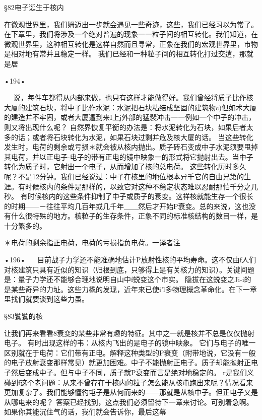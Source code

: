 {{§82电子诞生于核内

在微观世界里，我们姆迈出一步就会遇见一些奇迹，这些，我们已经习以为常了。在下章里，我们将涉及一个绝对普遍的现象一一粒子间的相互转化。我们知道，在微观世界里，这种相互转化是这样自然而且寻常，正象在我们的宏观世界里，市物是相对地有常并且稳定一样。
我们已经和一种粒子间的相互转化打过交逍，那就是居

•194•
  



  
说，每件车都得从内部来做，也只有这样才能做得好。我们曾经将质子比作核大厦的建筑石块，将中子比作水泥：水泥把石块粘结成坚固的建筑物c)但如术大厦的建造并不牢固，或者大厦遭到来I上j外部的猛裴冲击一一例如一个中子的冲击，则又将出现什么呢？
自然界恢复平衡的办法是：将水泥转化为石块，如果后者太多的话；或者将石块转化为水泥，如果石块过剩并危及核大厦的话。
当这些转化发生时，电荷的剩余或亏损＊就会被从核内抛出。质子砖石变成中子水泥须要甩掉其电荷，并以正电子-电子的带有正电的镜中映象一的形式将它抛射出去。当中子转化为质子时，它射出一个电子，从而增加了核的总电荷。
这些转化历时多久呢？不是12分钟。我们已经说过：中子在核里的地位根本异千它的自由兄第的生涯。有时候核内的条件是那样的，以致它对这种不稳定状态难以忍耐那怕千分之几秒。
有时候核内的这些条件抑制了中子或质子的衰变。这祥核就能生存一个很长的时期——－往往平均几百年或几千年＿＿然后才开始P衰变。总的来说，这也没有什么很特殊的地方。核粒子的生存条件，正象不同的标准核结构的数目一样，是十分繁多的。

＊电荷的剩余指正电荷，电荷的亏损指负电荷。一译者注

•196•
  
目前战子力学还不能准确地估计P放射性核的平均寿命。这不仅由f人们对核建筑只具有近似的知识（归根到底，只够得上是有关核力的知识）。关键间题是：量子力学还不能够合理地说明自山中f蜕变这个市实。
隐拔在这蜕变之Ji-i的是某些奇异的力址。这些力橇的发现，近年来已使i'l多物理概念革命化。在下一章里找们就要谈到这些力虽。

§83饕饕的核

让我们再来看看8衰变的某些非常有趣的特征。其中之一就是核并不总是仅仅抛射电子。
有时出现这样的韦：从核内飞出的是电子的镜中映象。
它们与电子的唯一区别就在于电荷：它们带有正电。解释这种类型的P衰变（附带地说，它没有一般的电子放射衰变那样常见）就更加困难。中子不能抛射正电子。质子却能抛射正电子然后变成中子。但与中子不同，质子就P衰变而言是绝对地稳定的。
r是我们义碰到f这个老问题：从来不曾存在于核内的粒子怎么能从核屯跑出来呢？情况看来更加复杂了。我们能够懂彴屯子是从何而来的——那就是从核中子。但正电子又是从哪电来的呢？
答案已经找到，这点我们必须留待下一章来讨论。可别着急啊。如果你其能沉住气的话，我们就会告诉你，最后这幕

}}
